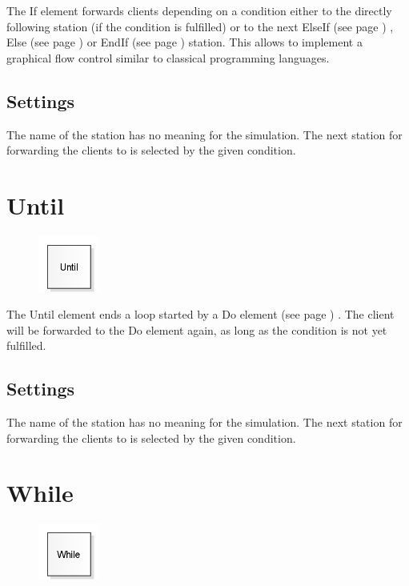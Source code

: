 The If element forwards clients depending on a condition either to the directly following station
(if the condition is fulfilled) or to the next ElseIf (see page \pageref{ref:ModelElementLogicElseIf}) ,
Else (see page \pageref{ref:ModelElementLogicElse}) or EndIf (see page \pageref{ref:ModelElementLogicEndIf}) 
station. This allows to implement a graphical flow control similar to classical programming
languages.

\subsection*{Settings}

The name of the station has no meaning for the simulation.
The next station for forwarding the clients to is selected by the given condition.


\section{Until}
\label{ref:ModelElementLogicUntil}

\begin{figure}
\vspace{-22pt}
\includegraphics[width=2cm]{imageModelElementLogicUntil.png}
\vspace{-22pt}
\end{figure}

The Until element ends a loop started by a
Do element (see page \pageref{ref:ModelElementLogicDo}) .
The client will be forwarded to the Do element again,
as long as the condition is not yet fulfilled.

\subsection*{Settings}

The name of the station has no meaning for the simulation.
The next station for forwarding the clients to is selected by the given condition.


\section{While}
\label{ref:ModelElementLogicWhile}

\begin{figure}
\vspace{-22pt}
\includegraphics[width=2cm]{imageModelElementLogicWhile.png}
\vspace{-22pt}
\end{figure}

